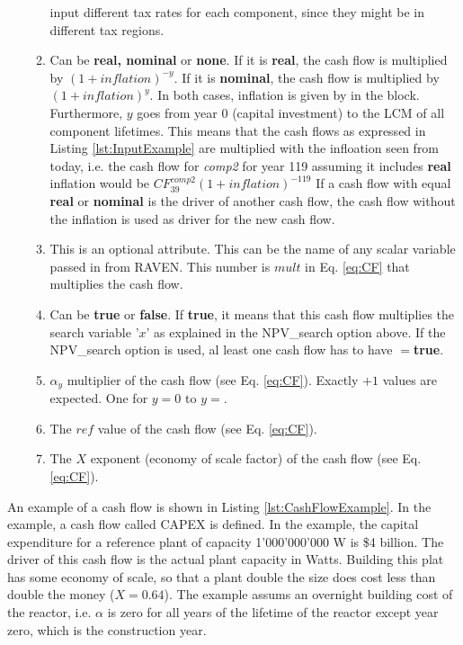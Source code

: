 \begin{enumerate}
\begin{enumerate}
      input different tax rates for each component, since they might be in different tax regions.
    \item[\xmlAttr{inflation}] Can be \textbf{real, nominal} or \textbf{none}. If it is \textbf{real}, the cash flow is multiplied by
      $(1+inflation)^{-y}$. If it is \textbf{nominal}, the cash flow is multiplied by $(1+inflation)^y$.
      In both cases, inflation is given by  in the  block. Furthermore, $y$ goes from year 0 (capital investment)
      to the LCM of all component lifetimes.
      This means that the cash flows as expressed in Listing \ref{lst:InputExample} are multiplied with the infloation seen from today, i.e. the cash
      flow for \textit{comp2} for year 119 assuming it includes \textbf{real}
      inflation would be $CF^{comp2}_{39}(1+inflation)^{-119}$
      If a cash flow with  equal \textbf{real} or \textbf{nominal} is the driver of another cash flow, the cash flow without
      the inflation is used as driver for the new cash flow.
    \item[\xmlAttr{multiply}] This is an optional attribute. This can be the name of any scalar variable passed in from RAVEN. This number
      is $mult$ in Eq. \ref{eq:CF} that multiplies the cash flow.
    \item[\xmlAttr{mult\_target}] Can be \textbf{true} or \textbf{false}. If \textbf{true}, it means that this cash flow multiplies
      the search variable '$x$' as explained in the NPV\_search option above.
      If the NPV\_search option is used, al least one cash flow has to have $=$\textbf{true}.
    \item[\xmlNode{alpha}] $\alpha_{y}$ multiplier of the cash flow (see Eq. \ref{eq:CF}). Exactly $ + 1$
      values are expected. One for $y=0$ to $y=$.
    \item[\xmlNode{reference}] The $ref$ value of the cash flow (see Eq. \ref{eq:CF}).
    \item[\xmlNode{X}] The $X$ exponent (economy of scale factor) of the cash flow (see Eq. \ref{eq:CF}).
  \end{enumerate}
\end{enumerate}

An example of a cash flow is shown in Listing \ref{lst:CashFlowExample}. In the example, a cash flow called CAPEX is defined.
In the example, the capital expenditure for a reference plant of capacity
 1'000'000'000 W is \$4 billion. The driver of this cash flow is the actual plant capacity in Watts. Building this plat has some economy
 of scale, so that a plant double the size does cost
less than double the money ($X=0.64$). The example assums an overnight building cost of the reactor, i.e. $\alpha$ is zero for
all years of the lifetime of the reactor except year zero, which is the construction year.

